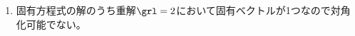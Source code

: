 \begin{ans*}
\begin{enumerate}[label=(\arabic*)]
\begin{enumerate}[label=(\roman*)]
\begin{gather}
{        }
        =\bm{0}
      \end{gather}
      よって
      \begin{gather}
        \bu =
        \Bmat{
          1 \\ 0 \\ -1
        }
      \end{gather}
      は固有ベクトルである。
      \item $\grl = 2$のとき
      \begin{gather}
        (\grl\bE - \bA)\bu = \bm{0} \\
        \bmat{
          1& -3& -2 \\
          0& 0& 0 \\
          -1& -1& 2
        }
        \Bmat{
          x \\ y \\ z
        }
        =\bm{0}
      \end{gather}
      よって
      \begin{gather}
        \bu =
        \Bmat{
          2 \\ 0 \\ 1
        }
      \end{gather}
      は固有ベクトルである。
    \end{enumerate}
    \item 固有方程式の解のうち重解$\grl = 2$において固有ベクトルが1つなので対角化可能でない。
  \end{enumerate}
\end{ans*}
